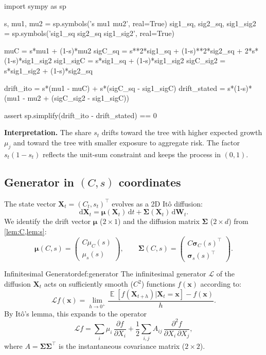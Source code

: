 ﻿\documentclass[11pt,letterpaper,oneside]{article}
\numberwithin{equation}{section}
\DeclareMathOperator{\E}{\mathbb{E}}
\newcommand{\1}{\mathbf{1}}
\newcommand{\diff}{\mathrm{d}}
\begin{document}
\begin{sympycheck}[title={Verification: Share dynamics}]
\begin{pyconsole}
import sympy as sp

s, mu1, mu2 = sp.symbols('s mu1 mu2', real=True)
sig1_sq, sig2_sq, sig1_sig2 = sp.symbols('sig1_sq sig2_sq sig1_sig2', real=True)

muC = s*mu1 + (1-s)*mu2
sigC_sq = s**2*sig1_sq + (1-s)**2*sig2_sq + 2*s*(1-s)*sig1_sig2
sig1_sigC = s*sig1_sq + (1-s)*sig1_sig2
sigC_sig2 = s*sig1_sig2 + (1-s)*sig2_sq

drift_ito = s*(mu1 - muC) + s*(sigC_sq - sig1_sigC)
drift_stated = s*(1-s)*(mu1 - mu2 + (sigC_sig2 - sig1_sigC))

assert sp.simplify(drift_ito - drift_stated) == 0
\end{pyconsole}
\end{sympycheck}

\begin{tcolorbox}[didacticstyle]
\textbf{Interpretation.} The share $s_t$ drifts toward the tree with higher expected growth $\mu_j$ and toward the tree with smaller exposure to aggregate risk. The factor $s_t(1-s_t)$ reflects the unit-sum constraint and keeps the process in $(0,1)$.
\end{tcolorbox}
\subsection{Generator in $(C,s)$ coordinates}
\medskip
The state vector $\bm{X}_t = (C_t, s_t)^{\top}$ evolves as a 2D It\^o diffusion:
\[
  \diff\bm{X}_t = \bm{\mu}(\bm{X}_t)\,\diff t + \bm{\Sigma}(\bm{X}_t)\,\diff\bm{W}_t.
\]
We identify the drift vector $\bm{\mu}$ ($2\times 1$) and the diffusion matrix $\bm{\Sigma}$ ($2\times d$) from \cref{lem:C,lem:s}:
\[
  \bm{\mu}(C,s) = \begin{pmatrix} C\mu_C(s) \\ \mu_s(s) \end{pmatrix}, \qquad
  \bm{\Sigma}(C,s) = \begin{pmatrix} C\bm{\sigma}_C(s)^{\top} \\ \bm{\sigma}_s(s)^{\top} \end{pmatrix}.
\]

\begin{definition}{Infinitesimal Generator}{def:generator}
The infinitesimal generator $\mathcal{L}$ of the diffusion $\bm{X}_t$ acts on sufficiently smooth ($C^2$) functions $f(\bm{x})$ according to:
\[
  \mathcal{L}f(\bm{x}) = \lim_{h\to 0^+} \frac{\E[f(\bm{X}_{t+h})|\bm{X}_t=\bm{x}]-f(\bm{x})}{h}.
\]
By It\^o's lemma, this expands to the operator
\[
  \mathcal{L}f = \sum_{i} \mu_i \,\frac{\partial f}{\partial X_i} + \frac12 \sum_{i,j} A_{ij} \,\frac{\partial^2 f}{\partial X_i \, \partial X_j},
\]
where $A = \bm{\Sigma}\bm{\Sigma}^{\top}$ is the instantaneous covariance matrix ($2\times 2$).
\end{definition}
\end{document}
